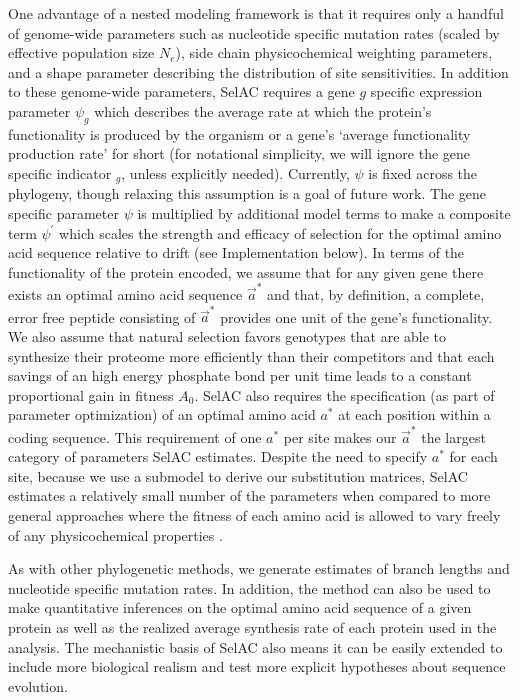 \documentclass[12pt,letterpaper,fleqn]{article}
\newcommand{\PC}{physicochemical\xspace}
\newcommand{\Ne}{\ensuremath{{N_e}}\xspace} %
\newcommand{\selac}{SelAC\xspace}
\newcommand{\aopt}{\ensuremath{a^*}\xspace}
\newcommand{\aoptvec}{\ensuremath{\Vec{a}^*}\xspace}
\newcommand{\psig}{\ensuremath{\psi_{g}}\xspace}
\newcommand{\psiprime}{\ensuremath{\psi^\prime}\xspace}
\begin{document}
One advantage of a nested modeling framework is that it requires only a handful of genome-wide parameters such as nucleotide specific mutation rates (scaled by effective population size \Ne), side chain physicochemical weighting parameters, and a shape parameter describing the distribution of site sensitivities.
In addition to these genome-wide parameters, \selac requires a gene $g$ specific expression parameter $\psig$ which describes the average rate at which the protein's functionality is produced by the organism or a gene's `average functionality production rate' for short (for notational simplicity, we will ignore the gene specific indicator $_g$, unless explicitly needed).
Currently, $\psi$ is fixed across the phylogeny, though relaxing this assumption is a goal of future work.
The gene specific parameter $\psi$ is multiplied by additional model terms to make a composite term $\psiprime$ which scales the strength and efficacy of selection for the optimal amino acid sequence relative to drift (see Implementation below).
In terms of the functionality of the protein encoded, we assume that for any given gene there exists an optimal amino acid sequence \aoptvec and that, by definition, a complete, error free peptide consisting of \aoptvec provides one unit of the gene's functionality.
We also assume that natural selection favors genotypes that are able to synthesize their proteome more efficiently than their competitors and that each savings of an high energy phosphate bond per unit time leads to a constant proportional gain in fitness $A_0$.
\selac also requires the specification (as part of parameter optimization) of an optimal amino acid \aopt at each position within a coding sequence.
This requirement of one \aopt per site makes our \aoptvec the largest category of parameters \selac estimates.
Despite the need to specify \aopt for each site, because we use a submodel to derive our substitution matrices, \selac estimates a relatively small number of the parameters when compared to more general approaches where the fitness of each amino acid is allowed to vary freely of any \PC properties \citep{HalpernAndBruno1998,LartillotAndPhilippe2004,RodrigueAndLartillot2014}.

As with other phylogenetic methods, we generate estimates of branch lengths and nucleotide specific mutation rates.
In addition, the method can also be used to make quantitative inferences on the optimal amino acid sequence of a given protein as well as the realized average synthesis rate of each protein used in the analysis.
The mechanistic basis of \selac also means it can be easily extended to include more biological realism and test more explicit hypotheses about sequence evolution.
\end{document}
